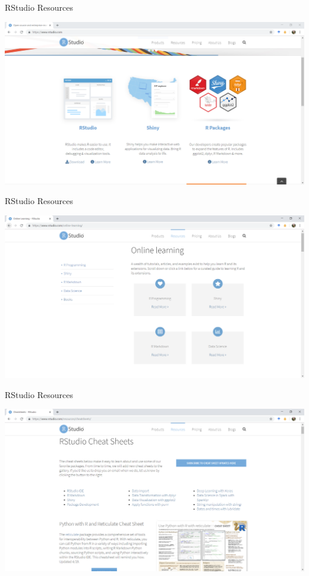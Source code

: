 \documentclass[
  ignorenonframetext,
]{beamer}
\begin{document}
\begin{frame}{RStudio Resources}
\protect\hypertarget{rstudio-resources}{}

\includegraphics{../external/images/rstudio_dot_com_1_main.PNG}

\end{frame}

\begin{frame}{RStudio Resources}
\protect\hypertarget{rstudio-resources-1}{}

\includegraphics{../external/images/rstudio_dot_com_2_learning.PNG}

\end{frame}

\begin{frame}{RStudio Resources}
\protect\hypertarget{rstudio-resources-2}{}

\includegraphics{../external/images/rstudio_dot_com_3_cheats.PNG}

\end{frame}
\end{document}
